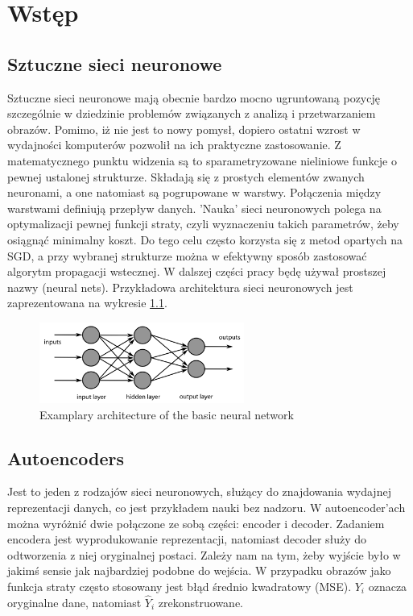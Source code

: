 \chapter{Wstęp}

\section{Sztuczne sieci neuronowe}

Sztuczne sieci neuronowe mają obecnie bardzo mocno ugruntowaną pozycję szczególnie w dziedzinie problemów związanych z analizą i przetwarzaniem obrazów. Pomimo, iż nie jest to nowy pomysł, dopiero ostatni wzrost w wydajności komputerów pozwolił na ich praktyczne zastosowanie. Z matematycznego punktu widzenia są to sparametryzowane nieliniowe funkcje o pewnej ustalonej strukturze. Składają się z prostych elementów zwanych neuronami, a one natomiast są pogrupowane w warstwy. Połączenia między warstwami definiują przepływ danych. 'Nauka' sieci neuronowych polega na optymalizacji pewnej funkcji straty, czyli wyznaczeniu takich parametrów, żeby osiągnąć minimalny koszt. Do tego celu często korzysta się z metod opartych na SGD, a przy wybranej strukturze można w efektywny sposób zastosować algorytm propagacji wstecznej. W dalszej części pracy będę używał prostszej nazwy (neural nets). Przykładowa architektura sieci neuronowych jest zaprezentowana na wykresie \ref{fig:neural_nets}.

\begin{figure}[h!]
    \centering
    \includegraphics[width=0.6\textwidth]{images/neural_nets}
    \caption{Examplary architecture of the basic neural network}
    \label{fig:neural_nets}
\end{figure}

\section{Autoencoders}

Jest to jeden z rodzajów sieci neuronowych, służący do znajdowania wydajnej reprezentacji danych, co jest przykładem nauki bez nadzoru. W autoencoder'ach można wyróżnić dwie połączone ze sobą części: encoder i decoder. Zadaniem encodera jest wyprodukowanie reprezentacji, natomiast decoder służy do odtworzenia z niej oryginalnej postaci. Zależy nam na tym, żeby wyjście było w jakimś sensie jak najbardziej podobne do wejścia. W przypadku obrazów jako funkcja straty często stosowany jest błąd średnio kwadratowy (MSE). $Y _ { i }$ oznacza oryginalne dane, natomiast $\hat { Y } _ { i }$ zrekonstruowane.

